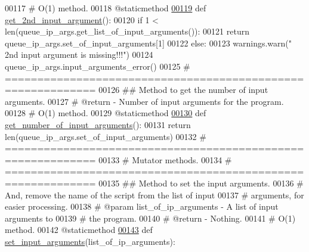 \begin{DoxyCode}
00117     \textcolor{comment}{#   O(1) method.}
00118     @staticmethod
\hypertarget{queue__ip__arguments_8py_source_l00119}{}\hyperlink{classutilities_1_1queue__ip__arguments_1_1queue__ip__args_a18e59da1e2c8044e79ca32a5455ef40b}{00119}     \textcolor{keyword}{def }\hyperlink{classutilities_1_1queue__ip__arguments_1_1queue__ip__args_a18e59da1e2c8044e79ca32a5455ef40b}{get\_2nd\_input\_argument}():
00120         \textcolor{keywordflow}{if} 1 < len(queue\_ip\_args.get\_list\_of\_input\_arguments()):
00121             \textcolor{keywordflow}{return} queue\_ip\_args.set\_of\_input\_arguments[1]
00122         \textcolor{keywordflow}{else}:
00123             warnings.warn(\textcolor{stringliteral}{" 2nd input argument is missing!!!"})
00124             queue\_ip\_args.input\_arguments\_error()
00125     \textcolor{comment}{# ============================================================}
00126     \textcolor{comment}{##  Method to get the number of input arguments.}
00127     \textcolor{comment}{#   @return - Number of input arguments for the program.}
00128     \textcolor{comment}{#   O(1) method.}
00129     @staticmethod
\hypertarget{queue__ip__arguments_8py_source_l00130}{}\hyperlink{classutilities_1_1queue__ip__arguments_1_1queue__ip__args_ab95a4242fd55bf5d126b35a5f5172593}{00130}     \textcolor{keyword}{def }\hyperlink{classutilities_1_1queue__ip__arguments_1_1queue__ip__args_ab95a4242fd55bf5d126b35a5f5172593}{get\_number\_of\_input\_arguments}():
00131         \textcolor{keywordflow}{return} len(queue\_ip\_args.set\_of\_input\_arguments)
00132     \textcolor{comment}{# ============================================================}
00133     \textcolor{comment}{#   Mutator methods.}
00134     \textcolor{comment}{# ============================================================}
00135     \textcolor{comment}{##  Method to set the input arguments.}
00136     \textcolor{comment}{#       And, remove the name of the script from the list of input}
00137     \textcolor{comment}{#       arguments, for easier processing.}
00138     \textcolor{comment}{#   @param list\_of\_ip\_arguments - A list of input arguments to}
00139     \textcolor{comment}{#       the program.}
00140     \textcolor{comment}{#   @return - Nothing.}
00141     \textcolor{comment}{#   O(1) method.}
00142     @staticmethod
\hypertarget{queue__ip__arguments_8py_source_l00143}{}\hyperlink{classutilities_1_1queue__ip__arguments_1_1queue__ip__args_a4b34415e7ff12abecd89b1e10755aa8d}{00143}     \textcolor{keyword}{def }\hyperlink{classutilities_1_1queue__ip__arguments_1_1queue__ip__args_a4b34415e7ff12abecd89b1e10755aa8d}{set\_input\_arguments}(list\_of\_ip\_arguments):

\end{DoxyCode}
